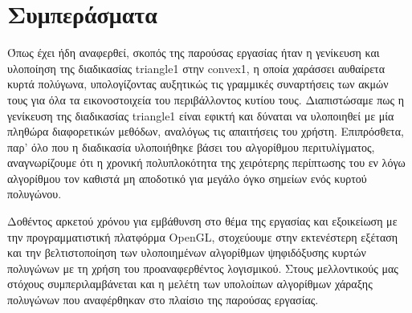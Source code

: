 
\chapter*{Συμπεράσματα}

Όπως έχει ήδη αναφερθεί, σκοπός της παρούσας εργασίας ήταν η γενίκευση και υλοποίηση της διαδικασίας \textlatin{triangle1} στην \textlatin{convex1}, η οποία χαράσσει αυθαίρετα κυρτά πολύγωνα, υπολογίζοντας αυξητικώς τις γραμμικές συναρτήσεις των ακμών τους για όλα τα εικονοστοιχεία του περιβάλλοντος κυτίου τους. Διαπιστώσαμε πως η γενίκευση της διαδικασίας \textlatin{triangle1} είναι εφικτή και δύναται να υλοποιηθεί με μία πληθώρα διαφορετικών μεθόδων, αναλόγως τις απαιτήσεις του χρήστη. Επιπρόσθετα, παρ’ όλο που η διαδικασία υλοποιήθηκε βάσει του αλγορίθμου περιτυλίγματος, αναγνωρίζουμε ότι η χρονική πολυπλοκότητα της χειρότερης περίπτωσης του εν λόγω αλγορίθμου τον καθιστά μη αποδοτικό για μεγάλο όγκο σημείων ενός κυρτού πολυγώνου.  \par

Δοθέντος αρκετού χρόνου για εμβάθυνση στο θέμα της εργασίας και εξοικείωση με την προγραμματιστική πλατφόρμα \textlatin{OpenGL}, στοχεύουμε στην εκτενέστερη εξέταση και την βελτιστοποίηση των υλοποιημένων αλγορίθμων ψηφιδόξυσης κυρτών πολυγώνων με τη χρήση του προαναφερθέντος λογισμικού. Στους μελλοντικούς μας στόχους συμπεριλαμβάνεται και η μελέτη των υπολοίπων αλγορίθμων χάραξης πολυγώνων που αναφέρθηκαν στο πλαίσιο της παρούσας εργασίας.
